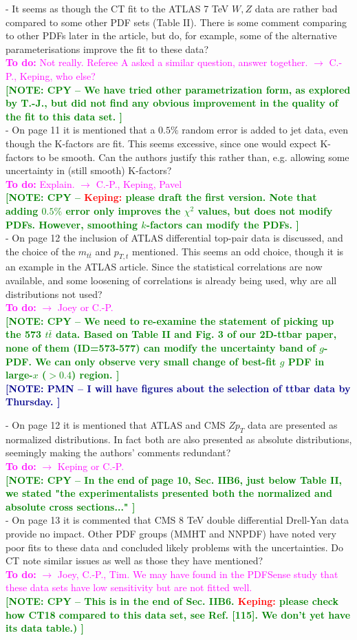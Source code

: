 \documentclass[aps,prd,amsmath,nofootinbib,floatfix,fleqn]{revtex4}
\newcommand{\TODO}[1]{\textcolor{magenta}{
\quad\vspace{3pt} \\ {\bf To do:} #1 \\
}}
\newcommand{\NOTECPY}[1]{\textcolor{green}{ \bf[NOTE: CPY -- #1 ]}}
\newcommand{\NOTEPN}[1]{\textcolor{darkblue}{ \bf[NOTE: PMN -- #1 ]}}
\begin{document}
- It seems as though the CT fit to the ATLAS 7 TeV $W,Z$ data are rather bad
compared to some other PDF sets (Table II). There is some comment comparing to
other PDFs later in the article, but do, for example, some of the alternative
parameterisations improve the fit to these data?
\TODO{Not really. Referee A asked a similar question, answer together. $\to$ C.-P., Keping, who else?}
\NOTECPY{We have tried other parametrization form, as explored by T.-J., but did not find any obvious  improvement in the quality of the fit to this data set.}\\


- On page 11 it is mentioned that a $0.5\%$  random error is added to jet data,
even though the K-factors are fit. This seems excessive, since one would expect
K-factors to be smooth. Can the authors justify this rather than, e.g. allowing
some uncertainty in (still smooth) K-factors?
\TODO{Explain. $\to$ C.-P., Keping, Pavel}
\NOTECPY{\textcolor{red}{Keping:} please draft the first version.
Note that adding $0.5\%$ error only improves the $\chi^2$ values, but does not modify PDFs. However, smoothing $k$-factors can modify the PDFs.
}\\

- On page 12 the inclusion of ATLAS differential top-pair data  is discussed,
and the choice of the $m_{t \bar t}$ and $p_{T,t}$ mentioned. This seems an odd
choice, though it is an example in the ATLAS article. Since the statistical
correlations are now available, and some loosening of correlations is already
being used, why are all distributions not used?
\TODO{$\to$ Joey or C.-P.}
\NOTECPY{We need to re-examine the statement of picking up the 573 $t \bar t$ data. Based on Table II and Fig. 3 of our 2D-ttbar paper, none of them (ID=573-577) can modify the uncertainty band of $g$-PDF. We can only observe very small change of best-fit $g$ PDF in large-$x$ ($> 0.4$) region.}\\
\NOTEPN{I will have figures about the selection of ttbar data by Thursday.}


- On page 12 it is mentioned that ATLAS and CMS $Z p_T$ data are presented as
normalized distributions. In fact both are also presented as absolute
distributions, seemingly making the authors' comments redundant?
\TODO{$\to$ Keping or C.-P.}
\NOTECPY{In the end of page 10, Sec. IIB6, just below Table II, we stated "the experimentalists presented both the normalized and absolute cross sections..."}\\

- On page 13 it is commented that CMS 8 TeV double differential Drell-Yan data
provide no impact. Other PDF groups (MMHT and NNPDF) have noted very poor fits
to these data and concluded likely problems with the uncertainties. Do CT note
similar issues as well as those they have mentioned?
\TODO{$\to$ Joey, C.-P., Tim. We may have found in the PDFSense study that these data sets have low sensitivity but are not fitted well.}
\NOTECPY{This is in the end of Sec. IIB6. \textcolor{red}{Keping:} please check how CT18 compared to this data set, see Ref. [115]. We don't yet have its data table.)}\\
\end{document}
